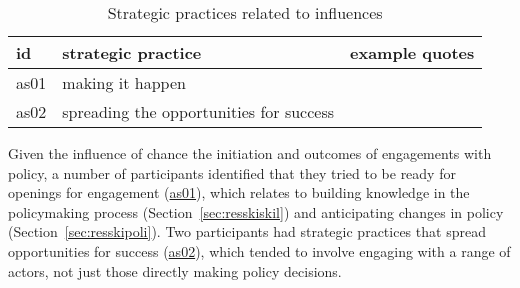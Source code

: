\begin{table}[!ht]
\footnotesize
\caption{Strategic practices related to \skiagen{} influences}\label{tab:resskiagenstrat}
\begin{tabular}{L{.06\linewidth}L{.3\linewidth}L{.64\linewidth}} \hline
\textbf{id} & \textbf{strategic practice} & \textbf{example quotes} \\ \hline \hline
as01 & making it happen &  \\[5mm]
as02 & spreading the opportunities for success &  \\[5mm]
\hline
 \end{tabular}
\end{table}

Given the influence of chance the initiation and outcomes of engagements with policy, a number of participants identified that they tried to be ready for openings for engagement (\hyperref[tab:resskiagenstrat]{as01}), which relates to building knowledge in the policymaking process (Section~\ref{sec:resskiskil}) and anticipating changes in policy (Section~\ref{sec:resskipoli}). Two participants had strategic practices that spread opportunities for success (\hyperref[tab:resskiagenstrat]{as02}), which tended to involve engaging with a range of actors, not just those directly making policy decisions.

\subsection{\titpers}\label{sec:resskipers}

